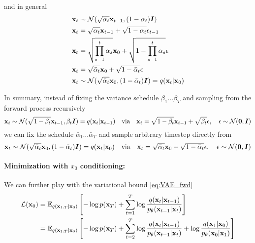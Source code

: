 and in general
\begin{align}\label{eq:xt_sampling}
    {\mathbf{x}}_t &\sim \mathcal{N}(\sqrt{\alpha_t} {\mathbf{x}}_{t-1}, (1 -\alpha_t) {\bm{I}}) \nonumber \\
    {\mathbf{x}}_t &= \sqrt{\alpha_t} {\mathbf{x}}_{t-1} + \sqrt{1 -\alpha_t} {\mathbf{\epsilon}}_{t-1} \nonumber \\
    {\mathbf{x}}_t &= \sqrt{\prod_{s=1}^t \alpha_s} {\mathbf{x}}_0 + \sqrt{1 - \prod_{s=1}^t \alpha_s} {\mathbf{\epsilon}} \nonumber \\
    {\mathbf{x}}_t &= \sqrt{\bar{\alpha}_t} {\mathbf{x}}_0 + \sqrt{1 - \bar{\alpha}_t} {\mathbf{\epsilon}} \\
    {\mathbf{x}}_t &\sim \mathcal{N}(\sqrt{\bar{\alpha}_t} {\mathbf{x}}_0, (1 - \bar{\alpha}_t) {\bm{I}}) = q({\mathbf{x}}_t | {\mathbf{x}}_0) \nonumber
\end{align}

In summary, instead of fixing the variance schedule $\beta_1 \ldots \beta_T$ and sampling from the forward process recursively 
\begin{equation}
    {\mathbf{x}}_t \sim \mathcal{N}(\sqrt{1-\beta_t} {\mathbf{x}}_{t-1}, \beta_t {\bm{I}}) = q({\mathbf{x}}_t | {\mathbf{x}}_{t-1}) \quad \text{via} \quad {\mathbf{x}}_t = \sqrt{1-\beta_t} {\mathbf{x}}_{t-1} + \sqrt{\beta_t} {\mathbf{\epsilon}}, \quad {\mathbf{\epsilon}} \sim \mathcal{N}(\mathbf{0}, {\bm{I}})
\end{equation}
we can fix the schedule $\bar{\alpha}_1 \ldots \bar{\alpha}_T$ and sample arbitrary timestep directly from
\begin{equation}
    {\mathbf{x}}_t \sim \mathcal{N}(\sqrt{\bar{\alpha}_t} {\mathbf{x}}_0, (1 - \bar{\alpha}_t) {\bm{I}})  = q({\mathbf{x}}_t | {\mathbf{x}}_0) \quad \text{via} \quad {\mathbf{x}}_t = \sqrt{\bar{\alpha}_t} {\mathbf{x}}_0 + \sqrt{1 - \bar{\alpha}_t} {\mathbf{\epsilon}}, \quad {\mathbf{\epsilon}} \sim \mathcal{N}(\mathbf{0}, {\bm{I}})
\end{equation}

\paragraph{Minimization with $x_0$ conditioning:}
We can further play with the variational bound \eqref{eq:VAE_fwd}
\begin{align}
    \mathcal{L}({\mathbf{x}}_0) &= \mathbb{E}_{q({\mathbf{x}}_{1:T} | {\mathbf{x}}_0)} \left[ - \log p({\mathbf{x}}_T) + \sum_{t=1}^T \log \frac{q({\mathbf{x}}_{t} | {\mathbf{x}}_{t-1})}{p_{\theta}({\mathbf{x}}_{t-1} | {\mathbf{x}}_t) } \right] \nonumber \\
    &= \mathbb{E}_{q({\mathbf{x}}_{1:T} | {\mathbf{x}}_0)} \left[ - \log p({\mathbf{x}}_T) + \sum_{t=2}^T \log \frac{q({\mathbf{x}}_{t} | {\mathbf{x}}_{t-1})}{p_{\theta}({\mathbf{x}}_{t-1} | {\mathbf{x}}_t) } + \log \frac{q({\mathbf{x}}_1 | {\mathbf{x}}_0)}{p_{\theta}({\mathbf{x}}_0 | {\mathbf{x}}_1) } \right] \nonumber \\
\end{align} 

